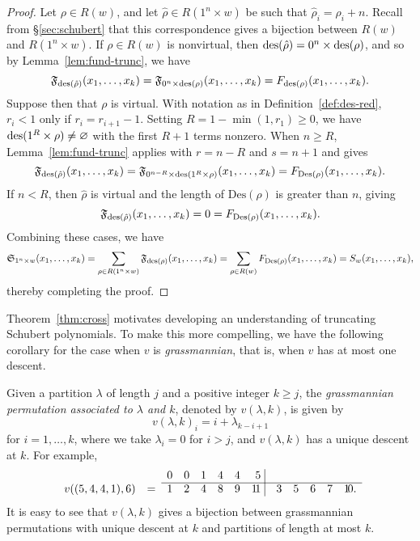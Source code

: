 \documentclass[11pt]{amsart}
\theoremstyle{definition}
\theoremstyle{remark}
\numberwithin{equation}{section}
\newcommand{\des}{\ensuremath\mathrm{des}}
\newcommand{\R}{\ensuremath{R}}
\newcommand{\schubert}{\ensuremath\mathfrak{S}}
\newcommand{\fund}{\ensuremath\mathfrak{F}}
\newcommand{\stanley}{\ensuremath{S}}
\begin{document}
\begin{proof}
  Let $\rho \in \R(w)$, and let $\hat{\rho} \in \R(1^n\times w)$ be such that $\hat{\rho}_i = \rho_i + n$. Recall from \S\ref{sec:schubert} that this correspondence gives a bijection between $\R(w)$ and $\R(1^n\times w)$. If $\rho\in\R(w)$ is nonvirtual, then $\des(\hat{\rho}) = 0^n\times\des(\rho)$, and so by Lemma~\ref{lem:fund-trunc}, we have
  \[ \fund_{\des(\hat{\rho})} (x_1,\ldots,x_k) = \fund_{0^n \times \des(\rho)}(x_1,\ldots,x_k) = F_{\des(\rho)}(x_1,\ldots,x_k).\]
  Suppose then that $\rho$ is virtual. With notation as in Definition~\ref{def:des-red}, $r_i<1$ only if $r_i = r_{i+1}-1$. Setting $R = 1-\min(1,r_1) \geq 0$, we have $\des(1^R \times \rho) \neq \varnothing$ with the first $R+1$ terms nonzero. When $n\geq R$, Lemma~\ref{lem:fund-trunc} applies with $r = n-R$ and $s = n+1$ and gives
  \[ \fund_{\des(\hat{\rho})} (x_1,\ldots,x_k) = \fund_{0^{n-R} \times \des(1^{R}\times\rho)} (x_1,\ldots,x_k) = F_{\mathrm{Des}(\rho)} (x_1,\ldots,x_k).\]
  If $n<R$, then $\hat{\rho}$ is virtual and the length of $\mathrm{Des}(\rho)$ is greater than $n$, giving
  \[ \fund_{\des(\hat{\rho})} (x_1,\ldots,x_k) = 0 = F_{\mathrm{Des}(\rho)} (x_1,\ldots,x_k).\]
  Combining these cases, we have
  \begin{displaymath}
    \schubert_{1^n \times w} (x_1,\ldots,x_k) = \sum_{\rho \in \R(1^n \times w)} \fund_{\des(\rho)} (x_1,\ldots,x_k) 
    = \sum_{\rho\in\R(w)} F_{\mathrm{Des}(\rho)}(x_1,\ldots,x_k) = \stanley_w(x_1,\ldots,x_k),
  \end{displaymath}
  thereby completing the proof.
\end{proof}

Theorem~\ref{thm:cross} motivates developing an understanding of truncating Schubert polynomials. To make this more compelling, we have the following corollary for the case when $v$ is \emph{grassmannian}, that is, when $v$ has at most one descent. 

Given a partition $\lambda$ of length $j$ and a positive integer $k \geq j$, the \emph{grassmannian permutation associated to $\lambda$ and $k$}, denoted by $v(\lambda,k)$, is given by
\begin{equation}
  v(\lambda,k)_i = i + \lambda_{k-i+1}
  \label{e:grass}
\end{equation}
for $i = 1,\ldots,k$, where we take $\lambda_i=0$ for $i>j$, and $v(\lambda,k)$ has a unique descent at $k$. For example,
\begin{displaymath}
  \begin{array}{rcrrrrrrrrrrr}
    & & 0 & 0 & 1 & 4 & 4 & 5 \ \vline & & & & & \\\cline{3-13}
    v((5,4,4,1), 6) & = & 1 & 2 & 4 & 8 & 9 & 1\!1 \ \vline & 3 & 5 & 6 & 7 & 1\!0 . 
  \end{array}
\end{displaymath}
It is easy to see that $v(\lambda,k)$ gives a bijection between grassmannian permutations with unique descent at $k$ and partitions of length at most $k$.
\end{document}
